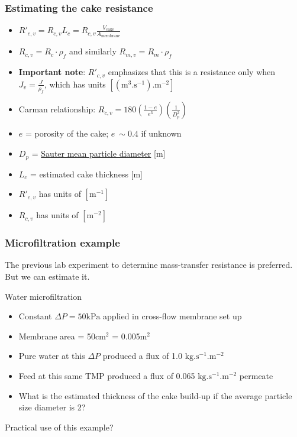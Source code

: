 \begin{frame}\frametitle{Estimating the cake resistance}
	\begin{itemize}		
		\item	$R'_{c,v} = R_{c,v} L_c = R_{c,v} \displaystyle\frac{V_\text{cake}}{A_\text{membrane}}$
		\item	$R_{c,v} = R_{c} \cdot \rho_f$ and similarly $R_{m,v} = R_{m} \cdot \rho_f$
		\item	\textbf{Important note}: $R'_{c,v}$ emphasizes that this is a resistance only when $J_v = \displaystyle\frac{J}{\rho_f}$, which has units $[\left(\text{m}^3.\text{s}^{-1}\right)\text{.m}^{-2}]$
		\item	Carman relationship: $R_{c,v} = 180 \left( \displaystyle \frac{1-e}{e^3} \right)\left(\displaystyle \frac{1}{D_p^2} \right)$ 
		\item	$e$ = porosity of the cake; $e ~\sim 0.4$ if unknown
		\item	$D_p$ = \href{http://en.wikipedia.org/wiki/Sauter_mean_diameter}{Sauter mean particle diameter} [m]
		\item	$L_c$ = estimated cake thickness [m]
		\item	$R'_{c,v}$ has units of $[\text{m}^{-1}]$
		\item	$R_{c,v}$ has units of $[\text{m}^{-2}]$
	\end{itemize}
\end{frame}

\begin{frame}\frametitle{Microfiltration example}
	The previous lab experiment to determine mass-transfer resistance is preferred. But we can estimate it. 
	\vspace{12pt}
	\begin{exampleblock}{Water microfiltration}
		\begin{itemize}
			\item	Constant $\Delta P = 50\text{kPa}$ applied in cross-flow membrane set up
			\item	Membrane area = 50cm$^2$ = 0.005m$^2$
			\item	Pure water at this $\Delta P$ produced a flux of 1.0 $\text{kg}.\text{s}^{-1}\text{.m}^{-2}$
			\item	Feed at this same TMP produced a flux of 0.065 $\text{kg}.\text{s}^{-1}\text{.m}^{-2}$ permeate
			\item	What is the estimated thickness of the cake build-up if the average particle size diameter is 2\micron?
		\end{itemize}
	\end{exampleblock}
	\vfill
	Practical use of this example?
\end{frame}

